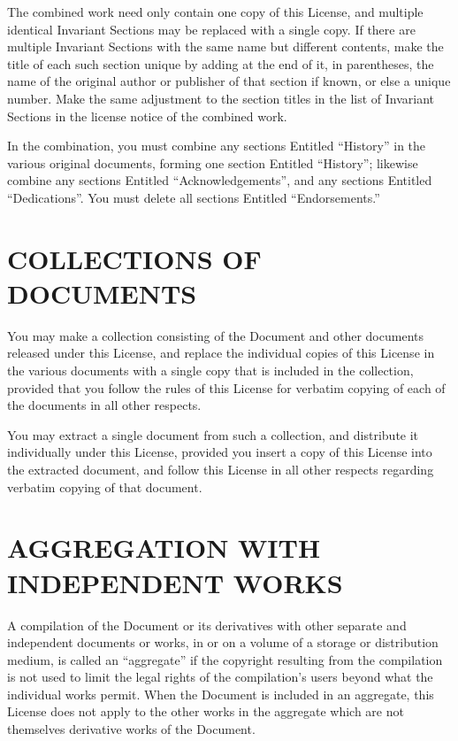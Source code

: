 The combined work need only contain one copy of this License, and
multiple identical Invariant Sections may be replaced with a single
copy. If there are multiple Invariant Sections with the same name but
different contents, make the title of each such section unique by adding
at the end of it, in parentheses, the name of the original author or
publisher of that section if known, or else a unique number. Make the
same adjustment to the section titles in the list of Invariant Sections
in the license notice of the combined work.

In the combination, you must combine any sections Entitled ``History''
in the various original documents, forming one section Entitled
``History''; likewise combine any sections Entitled
``Acknowledgements'', and any sections Entitled ``Dedications''. You
must delete all sections Entitled ``Endorsements.''

\section{COLLECTIONS OF DOCUMENTS}\label{collections-of-documents}

You may make a collection consisting of the Document and other documents
released under this License, and replace the individual copies of this
License in the various documents with a single copy that is included in
the collection, provided that you follow the rules of this License for
verbatim copying of each of the documents in all other respects.

You may extract a single document from such a collection, and distribute
it individually under this License, provided you insert a copy of this
License into the extracted document, and follow this License in all
other respects regarding verbatim copying of that document.

\section{AGGREGATION WITH INDEPENDENT
WORKS}\label{aggregation-with-independent-works}

A compilation of the Document or its derivatives with other separate and
independent documents or works, in or on a volume of a storage or
distribution medium, is called an ``aggregate'' if the copyright
resulting from the compilation is not used to limit the legal rights of
the compilation's users beyond what the individual works permit. When
the Document is included in an aggregate, this License does not apply to
the other works in the aggregate which are not themselves derivative
works of the Document.

